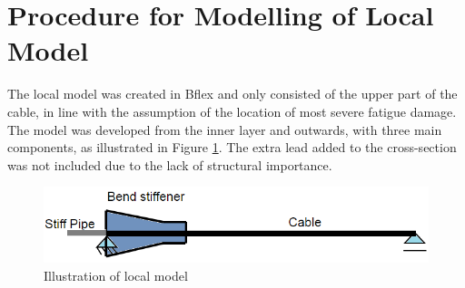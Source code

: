 \section{Procedure for Modelling of Local Model}
\label{sec:localmodel}
The local model was created in Bflex and only consisted of the upper part of the cable, in line with the assumption of the location of most severe fatigue damage. The model was developed from the inner layer and outwards, with three main components, as illustrated in Figure \ref{fig:localmod}. The extra lead added to the cross-section was not included due to the lack of structural importance.
\begin{figure}[H]
\centering
\includegraphics[scale=0.7]{figures/localmod.png}
\caption [$\; \:$Illustration of the local model]{Illustration of local model}
 \label{fig:localmod}
\end{figure}
